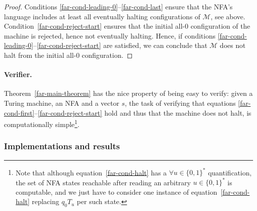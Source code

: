 \begin{proof}
    Conditions \eqref{far-cond-leading-0}--\eqref{far-cond-last} ensure that the NFA's language includes at least all eventually halting configurations of $\mathcal{M}$, see above. Condition~\eqref{far-cond-reject-start} ensures that the initial all-0 configuration of the machine is rejected, hence not eventually halting. Hence, if conditions \eqref{far-cond-leading-0}--\eqref{far-cond-reject-start} are satisfied, we can conclude that $\mathcal{M}$ does not halt from the initial all-0 configuration.
\end{proof}

\paragraph{Verifier.} Theorem~\ref{far-main-theorem} has the nice property of being easy to verify: given a Turing machine, an NFA and a vector $s$, the task of verifying that equations \eqref{far-cond-first}--\eqref{far-cond-reject-start} hold and thus that the machine does not halt, is computationally simple\footnote{Note that although equation~\eqref{far-cond-halt} has a $\forall u\in\{0, 1\}^*$ quantification, the set of NFA states reachable after reading an arbitrary $u \in \{0,1\}^*$ is computable, and we just have to consider one instance of equation~\eqref{far-cond-halt} replacing $q_0 T_u$ per such state.}.



\subsubsection{Implementations and results}\label{sec:FAR:results}





